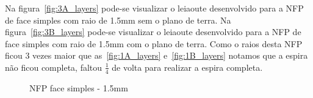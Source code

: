 Na figura~\ref{fig:3A_layers} pode-se visualizar o leiaoute desenvolvido para a NFP de face simples com raio de 1.5mm sem o plano de terra. Na figura~\ref{fig:3B_layers} pode-se visualizar o leiaoute desenvolvido para a NFP de face simples com raio de 1.5mm com o plano de terra. Como o raios desta NFP ficou 3 vezes maior que as~\ref{fig:1A_layers} e~\ref{fig:1B_layers} notamos que a espira não ficou completa, faltou $\frac{1}{4}$ de volta para realizar a espira completa.
\begin{figure}[htb!]
	\centering
 	\caption{NFP face simples - 1.5mm}
\end{figure}

